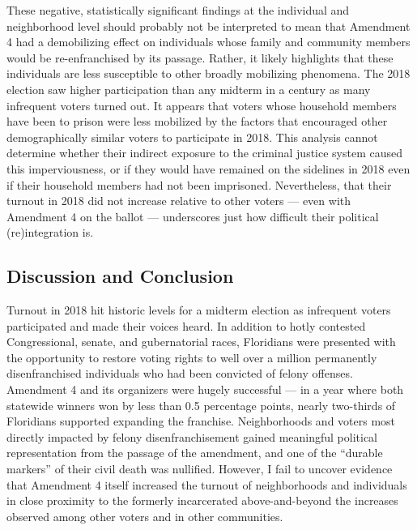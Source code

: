 \documentclass[
  12pt,
]{article}
\begin{document}
These negative, statistically significant findings at the individual and neighborhood level should probably not be interpreted to mean that Amendment 4 had a demobilizing effect on individuals whose family and community members would be re-enfranchised by its passage. Rather, it likely highlights that these individuals are less susceptible to other broadly mobilizing phenomena. The 2018 election saw higher participation than any midterm in a century as many infrequent voters turned out. It appears that voters whose household members have been to prison were less mobilized by the factors that encouraged other demographically similar voters to participate in 2018. This analysis cannot determine whether their indirect exposure to the criminal justice system caused this imperviousness, or if they would have remained on the sidelines in 2018 even if their household members had not been imprisoned. Nevertheless, that their turnout in 2018 did not increase relative to other voters --- even with Amendment 4 on the ballot --- underscores just how difficult their political (re)integration is.

\hypertarget{discussion-and-conclusion}{%
\subsection*{Discussion and Conclusion}\label{discussion-and-conclusion}}

Turnout in 2018 hit historic levels for a midterm election as infrequent voters participated and made their voices heard. In addition to hotly contested Congressional, senate, and gubernatorial races, Floridians were presented with the opportunity to restore voting rights to well over a million permanently disenfranchised individuals who had been convicted of felony offenses. Amendment 4 and its organizers were hugely successful --- in a year where both statewide winners won by less than 0.5 percentage points, nearly two-thirds of Floridians supported expanding the franchise. Neighborhoods and voters most directly impacted by felony disenfranchisement gained meaningful political representation from the passage of the amendment, and one of the ``durable markers'' of their civil death was nullified. However, I fail to uncover evidence that Amendment 4 itself increased the turnout of neighborhoods and individuals in close proximity to the formerly incarcerated above-and-beyond the increases observed among other voters and in other communities.
\end{document}
